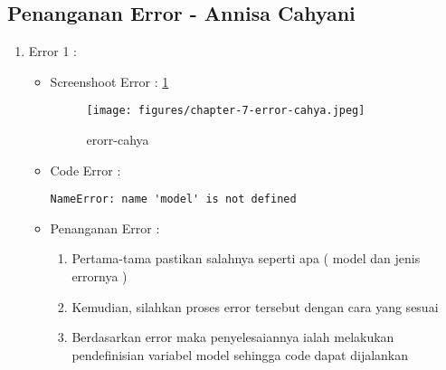 \subsection{Penanganan Error - Annisa Cahyani}
\begin{enumerate}
\item Error 1	:
\begin{itemize}
\item Screenshoot Error : \ref{chapter-7-error-cahya}
\par
\par
\begin{figure}[!hbtp]
\centering
\texttt{[image: figures/chapter-7-error-cahya.jpeg]}
\caption{erorr-cahya}
\label{chapter-7-error-cahya}
\end{figure}
\par
\item Code Error :
\begin{lstlisting}
NameError: name 'model' is not defined
\end{lstlisting}
\item Penanganan Error :
\begin{enumerate}
\item Pertama-tama pastikan salahnya seperti apa ( model dan jenis errornya )
\item Kemudian, silahkan proses error tersebut dengan cara yang sesuai
\item Berdasarkan error maka penyelesaiannya ialah melakukan pendefinisian variabel model sehingga code dapat dijalankan 
\end{enumerate}
\end{itemize}
\end{enumerate}


